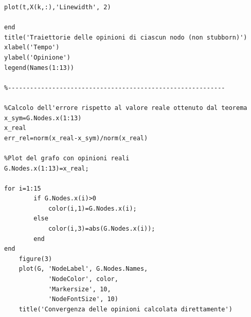 \documentclass[11pt,largemargins]{homework}
\begin{document}
\begin{alphaparts}
\begin{lstlisting}
plot(t,X(k,:),'Linewidth', 2) 

end
title('Traiettorie delle opinioni di ciascun nodo (non stubborn)')
xlabel('Tempo')
ylabel('Opinione')
legend(Names(1:13))

%-----------------------------------------------------------

%Calcolo dell'errore rispetto al valore reale ottenuto dal teorema
x_sym=G.Nodes.x(1:13)
x_real
err_rel=norm(x_real-x_sym)/norm(x_real)

%Plot del grafo con opinioni reali
G.Nodes.x(1:13)=x_real;

for i=1:15
        if G.Nodes.x(i)>0
            color(i,1)=G.Nodes.x(i);
        else
            color(i,3)=abs(G.Nodes.x(i));
        end
end
    figure(3)
    plot(G, 'NodeLabel', G.Nodes.Names,
            'NodeColor', color, 
            'Markersize', 10, 
            'NodeFontSize', 10)
    title('Convergenza delle opinioni calcolata direttamente')

  \end{lstlisting}


\end{alphaparts}
\end{document}
